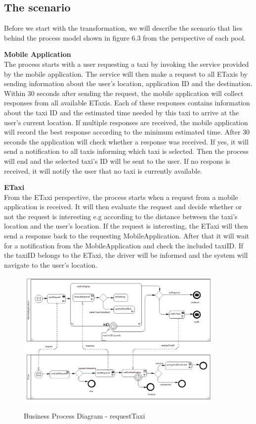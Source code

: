 \newpage
\subsection{The scenario}
Before we start with the transformation, we will describe the scenario that lies behind the process model shown in figure 6.3 from the perspective of each pool. 

\textbf{Mobile Application}\\
The process starts with a user requesting a taxi by invoking the service provided by the mobile application. The service will then make a request to all ETaxis by sending information about the user's location, application ID and the destination. Within 30 seconds after sending the request, the mobile application will collect responses from all available ETaxis. Each of these responses contains information about the taxi ID and the estimated time needed by this taxi to arrive at the user's current location. If multiple responses are received, the mobile application will record the best response according to the minimum estimated time. After 30 seconds the application will check whether a response was received. If yes, it will send a notification to all taxis informing which taxi is selected. Then the process will end and the selected taxi's ID will be sent to the user. If no respons is received, it will notify the user that no taxi is currently available. 


\textbf{ETaxi}\\
From the ETaxi perspective, the process starts when a request from a mobile application is received. It will then evaluate the request and decide whether or not the request is interesting e.g according to the distance between the taxi's location and the user's location. If the request is interesting, the ETaxi will then send a response back to the requesting MobileApplication. After that it will wait for a notification from the MobileApplication and check the included taxiID. If the taxiID belongs to the ETaxi, the driver will be informed and the system will navigate to the user's location.


\begin{figure}
	\centering
		\includegraphics[width = 0.9\textwidth]{images/example/requestTaxi.png}
	\label{fig:example}
	\caption{Business Process Diagram - requestTaxi}
\end{figure}


